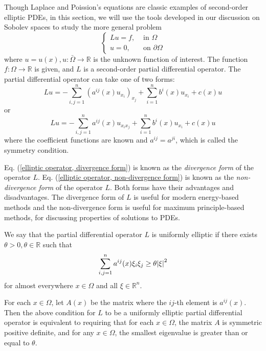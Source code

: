 \documentclass[10pt]{article}
\begin{document}
Though Laplace and Poission's equations are classic examples of second-order elliptic PDEs, in this section, we will use the tools developed in our discussion on Sobolev spaces to study the more general problem 
\begin{equation}
	\label{boundary value problem, elliptic pde}
	\displaystyle \begin{cases}
		Lu = f, & \textrm{ in } \Omega \\
		u = 0, & \textrm{ on } \partial \Omega
	\end{cases}
\end{equation}
where $u = u(x), u: \bar{\Omega} \to \mathbb{R}$ is the unknown function of interest. The function $f: \Omega \to \mathbb{R}$ is given, and $L$ is a second-order partial differential operator. The partial differential operator can take one of two forms: 
\begin{equation}
	\label{elliptic operator, divergence form}
	\displaystyle Lu = -\sum\limits_{i,j=1}^{n}{\left( a^{ij}(x)u_{x_i} \right)_{x_j}} + \sum\limits_{i = 1}^{n}{b^i(x)u_{x_i}} + c(x) u
\end{equation}
or 
\begin{equation}
	\label{elliptic operator, non-divergence form}
	\displaystyle Lu = -\sum\limits_{i,j=1}^{n}{a^{ij}(x)u_{x_ix_j}} + \sum\limits_{i = 1}^{n}{b^i(x)u_{x_i}} + c(x) u
\end{equation}
where the coefficient functions are known and $a^{ij} = a^{ji}$, which is called the symmetry condition. 

Eq. (\ref{elliptic operator, divergence form}) is known as the \textit{divergence form} of the operator $L$. Eq. (\ref{elliptic operator, non-divergence form}) is known as the \textit{non-divergence form} of the operator $L$. Both forms have their advantages and disadvantages. The divergence form of $L$ is useful for modern energy-based methods and the non-divergence form is useful for maximum principle-based methods, for discussing properties of solutions to PDEs. 

\begin{definition}
	We say that the partial differential operator $L$ is uniformly elliptic if there exists $\theta > 0, \theta \in \mathbb{R}$ such that 
	\begin{equation*}
		\displaystyle \sum\limits_{i,j=1}^{n}{a^{ij}(x)\xi_i\xi_j} \geq \theta \abs{\xi}^2
	\end{equation*} 
	for almost everywhere $x \in \Omega$ and all $\xi \in \mathbb{R}^n$. 
\end{definition}
For each $x \in \Omega$, let $A(x)$ be the matrix where the $ij$-th element is $a^{ij}(x)$. Then the above condition for $L$ to be a uniformly elliptic partial differential operator is equivalent to requiring that for each $x \in \Omega$, the matrix $A$ is symmetric positive definite, and for any $x \in \Omega$, the smallest eigenvalue is greater than or equal to $\theta$. 
\end{document}
